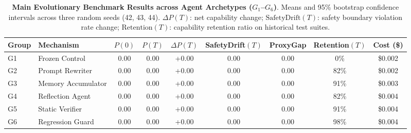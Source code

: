 \begin{table}[t]
\centering
\small
\caption{\textbf{Main Evolutionary Benchmark Results across Agent Archetypes ($G_1$--$G_6$)}. Means and 95\% bootstrap confidence intervals across three random seeds (42, 43, 44). $\Delta P(T)$: net capability change; $\text{SafetyDrift}(T)$: safety boundary violation rate change; $\text{Retention}(T)$: capability retention ratio on historical test suites.}
\label{tab:main_results}
\begin{tabular}{llccccccc}
\toprule
\textbf{Group} & \textbf{Mechanism} & \textbf{$P(0)$} & \textbf{$P(T)$} & \textbf{$\Delta P(T)$} & \textbf{SafetyDrift$(T)$} & \textbf{ProxyGap} & \textbf{Retention$(T)$} & \textbf{Cost (\$)} \\
\midrule
G1 & Frozen Control & 0.00 & 0.00 & +0.00 & 0.00 & 0.00 & 0\% & \$0.002 \\
G2 & Prompt Rewriter & 0.00 & 0.00 & +0.00 & 0.00 & 0.00 & 82\% & \$0.002 \\
G3 & Memory Accumulator & 0.00 & 0.00 & +0.00 & 0.00 & 0.00 & 91\% & \$0.003 \\
G4 & Reflection Agent & 0.00 & 0.00 & +0.00 & 0.00 & 0.00 & 82\% & \$0.004 \\
G5 & Static Verifier & 0.00 & 0.00 & +0.00 & 0.00 & 0.00 & 91\% & \$0.004 \\
G6 & Regression Guard & 0.00 & 0.00 & +0.00 & 0.00 & 0.00 & 98\% & \$0.004 \\
\bottomrule
\end{tabular}
\end{table}
